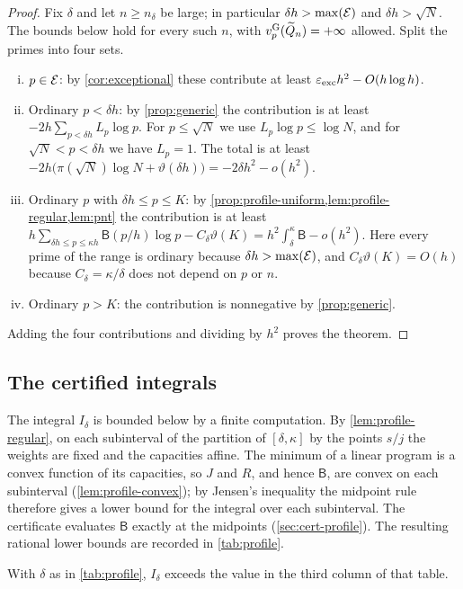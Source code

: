 \begin{proof}
Fix $\delta$ and let $n\ge n_\delta$ be large; in particular $\delta h>\max(\mathcal{E})$ and $\delta h>\sqrt N$. The bounds below hold for every such $n$, with $v^{\mathrm{G}}_{p}(\widetilde{Q}_n)=+\infty$ allowed. Split the primes into four sets.
\begin{enumerate}[(i)]
\item $p\in\mathcal{E}$: by \cref{cor:exceptional} these contribute at least $\varepsilon_{\mathrm{exc}}h^2-O(h\log h)$.
\item Ordinary $p<\delta h$: by \cref{prop:generic} the contribution is at least $-2h\sum_{p<\delta h}L_p\log p$. For $p\le\sqrt N$ we use $L_p\log p\le\log N$, and for $\sqrt N<p<\delta h$ we have $L_p=1$. The total is at least $-2h\bigl(\pi(\sqrt N)\log N+\vartheta(\delta h)\bigr)=-2\delta h^2-o(h^2)$.
\item Ordinary $p$ with $\delta h\le p\le K$: by \cref{prop:profile-uniform,lem:profile-regular,lem:pnt} the contribution is at least $h\sum_{\delta h\le p\le\kappa h}\mathsf B(p/h)\log p-C_\delta\vartheta(K)=h^2\int_\delta^\kappa\mathsf B-o(h^2)$. Here every prime of the range is ordinary because $\delta h>\max(\mathcal{E})$, and $C_\delta\vartheta(K)=O(h)$ because $C_\delta=\kappa/\delta$ does not depend on $p$ or $n$.
\item Ordinary $p>K$: the contribution is nonnegative by \cref{prop:generic}.
\end{enumerate}
Adding the four contributions and dividing by $h^2$ proves the theorem.
\end{proof}

\subsection{The certified integrals}\label{sec:profile-values}
The integral $I_\delta$ is bounded below by a finite computation. By \cref{lem:profile-regular}, on each subinterval of the partition of $[\delta,\kappa]$ by the points $s/j$ the weights are fixed and the capacities affine. The minimum of a linear program is a convex function of its capacities, so $J$ and $R$, and hence $\mathsf B$, are convex on each subinterval (\cref{lem:profile-convex}); by Jensen's inequality the midpoint rule therefore gives a lower bound for the integral over each subinterval. The certificate evaluates $\mathsf B$ exactly at the midpoints (\cref{sec:cert-profile}). The resulting rational lower bounds are recorded in \cref{tab:profile}.

\begin{proposition}\label{prop:profile-certificate}
With $\delta$ as in \cref{tab:profile}, $I_\delta$ exceeds the value in the third column of that table.
\end{proposition}

